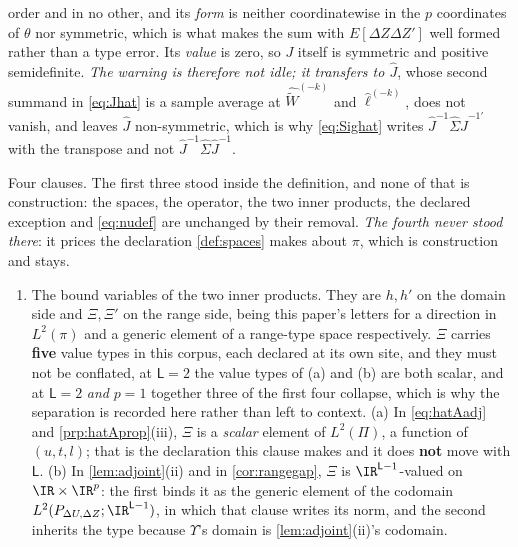 \begin{remark}
\begin{enumerate}
{order and in no other}, and its \emph{form} is neither coordinatewise in the
$p$ coordinates of $\theta$ nor symmetric, which is what
makes the sum with $E[\Delta Z\Delta Z']$ well formed rather than a type error. Its \emph{value} is zero,
so $J$ itself is symmetric and positive semidefinite. \emph{The warning is therefore not idle; it
transfers to $\hat J$}, whose second summand in \eqref{eq:Jhat} is a sample average at
$\widehat{\widetilde W}^{(-k)}$ and $\hat\ell^{(-k)}$, does not vanish, and leaves $\hat J$
non-symmetric, which is why \eqref{eq:Sighat} writes $\hat J^{-1}\hat\Sigma\hat J^{-1\prime}$ with the
transpose and not $\hat J^{-1}\hat\Sigma\hat J^{-1}$.
\end{enumerate}
\end{remark}

\begin{remark}\label{rem:spacesread}
Four clauses. The first three stood inside the definition, and none of that is construction: the spaces,
the operator, the two inner products, the declared exception and \eqref{eq:nudef} are unchanged by their
removal. \emph{The fourth never stood there}: it prices the declaration \cref{def:spaces} makes about
$\pi$, which is construction and stays.
\begin{enumerate}
\item[(1)] The bound variables of the two inner products. They are $h,h'$ on the
domain side and $\Xi,\Xi'$ on the range side, being this paper's letters for a direction in
$L^{2}(\pi)$ and a generic element of a range-type space respectively.
$\Xi$ carries \textbf{five} value types in this corpus, each declared at its own site, and they
must not be conflated, at $\mathsf L=2$ the value types of \textup{(a)} and \textup{(b)} are both
scalar, and at $\mathsf L=2$ \emph{and} $p=1$ together three of the first four collapse, which is why the
separation is recorded here rather than left to context. \textup{(a)} In \eqref{eq:hatAadj} and
\cref{prp:hatAprop}\textup{(iii)}, $\Xi$ is a \emph{scalar} element of $L^{2}(\Pi)$, a function of
$(u,t,l)$; that is the declaration this clause makes and it does \textbf{not} move with $\mathsf L$.
\textup{(b)} In \cref{lem:adjoint}\textup{(ii)} and in \cref{cor:rangegap}, $\Xi$ is
$\IR^{\mathsf L-1}$-valued on
$\IR\times\IR^{p}$: the first binds it as the generic element of the codomain
$L^{2}(P_{\Delta U,\Delta Z};\IR^{\mathsf L-1})$, in which that clause writes its norm, and the second
inherits the type because $\Upsilon$'s domain is \cref{lem:adjoint}\textup{(ii)}'s codomain.

\end{enumerate}
\end{remark}
